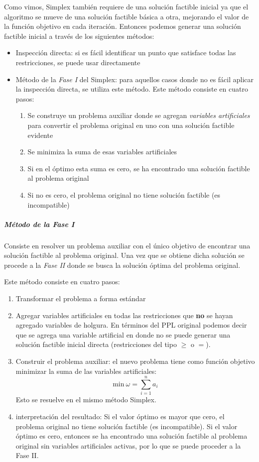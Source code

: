 Como vimos, Simplex también requiere de una solución factible inicial ya que el algoritmo se mueve de una solución factible básica a otra, mejorando el valor de la función objetivo en cada iteración. Entonces podemos generar una solución factible inicial a través de los siguientes métodos:
\begin{itemize}
  \item Inspección directa: si es fácil identificar un punto que satisface todas las restricciones, se puede usar directamente
  \item Método de la \textit{Fase I} del Simplex: para aquellos casos donde no es fácil aplicar la inspección directa, se utiliza este método. Este método consiste en cuatro pasos:
  \begin{enumerate}
    \item Se construye un problema auxiliar donde se agregan \textit{variables artificiales} para convertir el problema original en uno con una solución factible evidente
    \item Se minimiza la suma de esas variables artificiales
    \item Si en el óptimo esta suma es cero, se ha encontrado una solución factible al problema original
    \item Si no es cero, el problema original no tiene solución factible (es incompatible)
  \end{enumerate}
\end{itemize}

\subparagraph{Método de la Fase I}

Consiste en resolver un problema auxiliar con el único objetivo de encontrar una solución factible al problema original. Una vez que se obtiene dicha solución se procede a la \textit{Fase II} donde se busca la solución óptima del problema original.

Este método consiste en cuatro pasos:
\begin{enumerate}
  \item Transformar el problema a forma estándar
  \item Agregar variables artificiales en todas las restricciones que \textbf{no} se hayan agregado variables de holgura. En términos del PPL original podemos decir que se agrega una variable artificial en donde no se puede generar una solución factible inicial directa (restricciones del tipo \(\geq\) o \(=\)).
  \item Construir el problema auxiliar: el nuevo problema tiene como función objetivo minimizar la suma de las variables artificiales:
  \[\text{min}\ \omega = \sum_{i=1}^{n} a_i\]
  Esto se resuelve en el mismo método Simplex.
  \item interpretación del resultado: Si el valor óptimo es mayor que cero, el problema original no tiene solución factible (es incompatible). Si el valor óptimo es cero, entonces se ha encontrado una solución factible al problema original sin variables artificiales activas, por lo que se puede proceder a la Fase II.
\end{enumerate}


